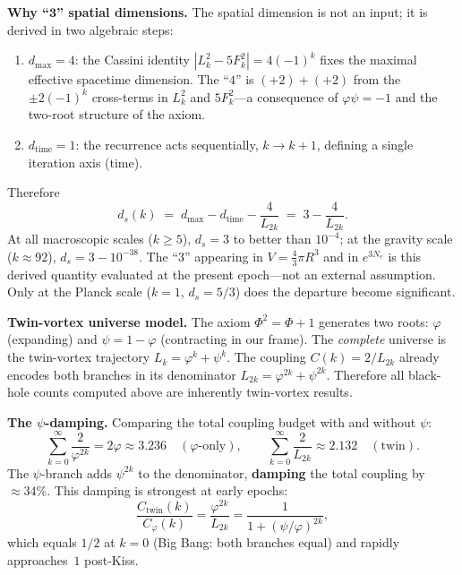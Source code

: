 \documentclass[12pt,a4paper]{article}
\begin{document}
\textbf{Why ``$\boldsymbol{3}$'' spatial dimensions.}\; The spatial dimension is not an input; it is derived in two algebraic steps:
\begin{enumerate}[nosep]
\item $d_{\max} = 4$\;: the Cassini identity $|L_k^2 - 5F_k^2| = 4(-1)^k$ fixes the maximal effective spacetime dimension.  The ``$4$'' is $(+2) + (+2)$ from the $\pm 2(-1)^k$ cross-terms in $L_k^2$ and $5F_k^2$---a consequence of $\varphi\psi = -1$ and the two-root structure of the axiom.
\item $d_{\mathrm{time}} = 1$\;: the recurrence acts sequentially, $k \to k + 1$, defining a single iteration axis (time).
\end{enumerate}
Therefore
\begin{equation}
d_s(k) \;=\; d_{\max} - d_{\mathrm{time}} - \frac{4}{L_{2k}} \;=\; 3 - \frac{4}{L_{2k}}.
\label{eq:ds-running}
\end{equation}
At all macroscopic scales ($k \geq 5$), $d_s = 3$ to better than $10^{-4}$; at the gravity scale ($k \approx 92$), $d_s = 3 - 10^{-38}$.  The ``$3$'' appearing in $V = \frac{4}{3}\pi R^3$ and in $e^{3N_e}$ is this derived quantity evaluated at the present epoch---not an external assumption.  Only at the Planck scale ($k = 1$, $d_s = 5/3$) does the departure become significant.

\textbf{Twin-vortex universe model.}\;  The axiom $\Phi^2 = \Phi + 1$ generates two roots: $\varphi$ (expanding) and $\psi = 1 - \varphi$ (contracting in our frame).  The \emph{complete} universe is the twin-vortex trajectory $L_k = \varphi^k + \psi^k$.  The coupling $C(k) = 2/L_{2k}$ already encodes both branches in its denominator $L_{2k} = \varphi^{2k} + \psi^{2k}$.  Therefore all black-hole counts computed above are inherently twin-vortex results.

\textbf{The $\psi$-damping.}\;  Comparing the total coupling budget with and without $\psi$:
\begin{equation}
\sum_{k=0}^{\infty} \frac{2}{\varphi^{2k}} = 2\varphi \approx 3.236 \quad(\varphi\text{-only}), \qquad
\sum_{k=0}^{\infty} \frac{2}{L_{2k}} \approx 2.132 \quad(\text{twin}).
\end{equation}
The $\psi$-branch adds $\psi^{2k}$ to the denominator, \textbf{damping} the total coupling by $\approx 34\%$.  This damping is strongest at early epochs:
\begin{equation}
\frac{C_{\mathrm{twin}}(k)}{C_{\varphi}(k)} = \frac{\varphi^{2k}}{L_{2k}} = \frac{1}{1 + (\psi/\varphi)^{2k}},
\label{eq:psi-damping}
\end{equation}
which equals $1/2$ at $k = 0$ (Big Bang: both branches equal) and rapidly approaches~$1$ post-Kiss.
\end{document}

